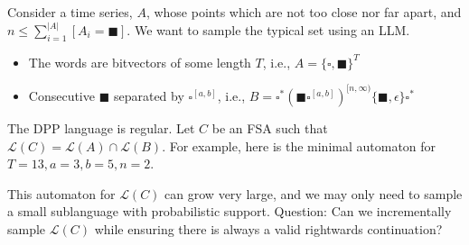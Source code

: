 \documentclass[portrait,a0b,final,a4resizeable]{a0poster}
\def\jointspacing{\vspace{0.3in}}
\newcommand{\bs}{\blacksquare}
\newcommand{\ws}{\square}
\begin{document}
\begin{poster}
\begin{multicols}{2}
    \jointspacing


      \jointspacing

      \hspace*{2cm}\begin{minipage}[c]{0.90\columnwidth}
      Consider a time series, $A$, whose points which are not too close nor far apart, and $n \leq \sum_{i=1}^{|A|} [A_i = \bs]$. We want to sample the typical set using an LLM.\vspace{0.5cm}
\begin{itemize}[leftmargin=2cm]
\item The words are bitvectors of some length $T$, i.e., $A = \{\ws, \bs\}^T$
\item Consecutive $\bs$ separated by $\ws^{[a,b]}$, i.e., $B = \ws^*(\bs\ws^{[a, b]})^{[n,\infty)}\{\bs,\epsilon\}\ws^*$
\end{itemize}\vspace{0.5cm}

The DPP language is regular. Let $C$ be an FSA such that $\mathcal{L}(C) = \mathcal{L}(A) \cap \mathcal{L}(B)$. For example, here is the minimal automaton for $T=13, a=3, b=5, n=2$.
      \end{minipage}

\jointspacing

\hspace{5cm}

\jointspacing

      \hspace*{2cm}\begin{minipage}[c]{0.90\columnwidth}
This automaton for $\mathcal{L}(C)$ can grow very large, and we may only need to sample a small sublanguage with probabilistic support.
Question: Can we incrementally sample $\mathcal{L}(C)$ while ensuring there is always a valid rightwards continuation?
\vspace{2cm}
      \end{minipage}


\end{multicols}
\end{poster}
\end{document}
